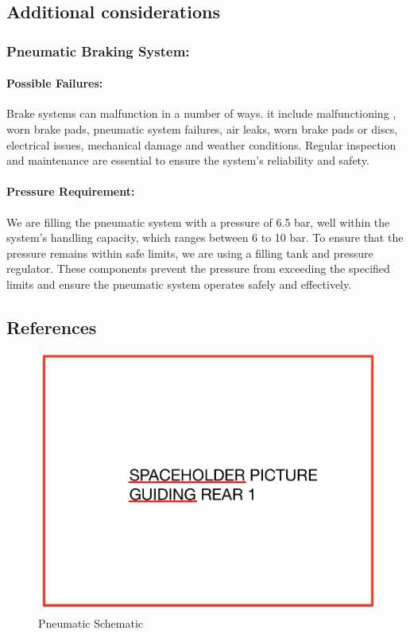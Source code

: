 \subsection{Additional considerations}
\noindent
\subsubsection{Pneumatic Braking System:}
\paragraph{Possible Failures:} Brake systems can malfunction in a number of ways. it include malfunctioning , worn brake pads, pneumatic system failures, air leaks, worn brake pads or discs, electrical issues,  mechanical damage and weather conditions. Regular inspection and maintenance are essential to ensure the system's reliability and safety.
\paragraph{Pressure Requirement:}We are filling the pneumatic system with a pressure of 6.5 bar, well within the system's handling capacity, which ranges between 6 to 10 bar. To ensure that the pressure remains within safe limits, we are using a filling tank and pressure regulator. These components prevent the pressure from exceeding the specified limits and ensure the pneumatic system operates safely and effectively.\\
  
	
\subsection{References}
\begin{figure}[!ht]
  \centering
    \includegraphics[width=\linewidth]{texfiles/mech/eimg/braking/guiding_rear_1.jpg}
    \caption{Pneumatic Schematic }
    \label{fig:Pneumatic Schematic}


\end{figure}

\newpage